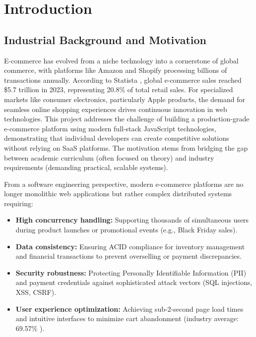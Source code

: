 \documentclass[12pt, a4paper]{report}
\begin{document}
\chapter{Introduction}

\section{Industrial Background and Motivation}

E-commerce has evolved from a niche technology into a cornerstone of global commerce, with platforms like Amazon and Shopify processing billions of transactions annually. According to Statista \cite{statista2023}, global e-commerce sales reached \$5.7 trillion in 2023, representing 20.8\% of total retail sales. For specialized markets like consumer electronics, particularly Apple products, the demand for seamless online shopping experiences drives continuous innovation in web technologies. This project addresses the challenge of building a production-grade e-commerce platform using modern full-stack JavaScript technologies, demonstrating that individual developers can create competitive solutions without relying on SaaS platforms. The motivation stems from bridging the gap between academic curriculum (often focused on theory) and industry requirements (demanding practical, scalable systems).

From a software engineering perspective, modern e-commerce platforms are no longer monolithic web applications but rather complex distributed systems requiring:

\begin{itemize}
    \item \textbf{High concurrency handling:} Supporting thousands of simultaneous users during product launches or promotional events (e.g., Black Friday sales).
    \item \textbf{Data consistency:} Ensuring ACID compliance for inventory management and financial transactions to prevent overselling or payment discrepancies.
    \item \textbf{Security robustness:} Protecting Personally Identifiable Information (PII) and payment credentials against sophisticated attack vectors (SQL injections, XSS, CSRF).
   

 \item \textbf{User experience optimization:} Achieving sub-2-second page load times and intuitive interfaces to minimize cart abandonment (industry average: 69.57\% \cite{baymard2023}).
\end{itemize}
\end{document}
